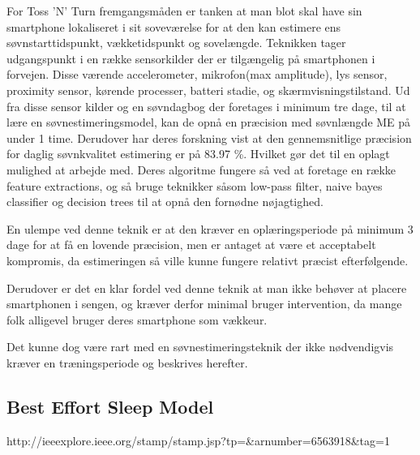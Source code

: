 For Toss 'N' Turn fremgangsmåden er tanken at man blot skal have sin smartphone lokaliseret i sit soveværelse for at den kan estimere ens søvnstarttidspunkt, vækketidspunkt og sovelængde.
Teknikken tager udgangspunkt i en række sensorkilder der er tilgængelig på smartphonen i forvejen.
Disse værende accelerometer, mikrofon(max amplitude), lys sensor, proximity sensor, kørende processer, batteri stadie, og skærmvisningstilstand.
Ud fra disse sensor kilder og en søvndagbog der foretages i minimum tre dage, til at lære en søvnestimeringsmodel, kan de opnå en præcision med søvnlængde ME på under 1 time.
Derudover har deres forskning vist at den gennemsnitlige præcision for daglig søvnkvalitet estimering er på 83.97 \%. Hvilket gør det til en oplagt mulighed at arbejde med.
Deres algoritme fungere så ved at foretage en række feature extractions, og så bruge teknikker såsom low-pass filter, naive bayes classifier og decision trees til at opnå den fornødne nøjagtighed.

En ulempe ved denne teknik er at den kræver en oplæringsperiode på minimum 3 dage for at få en lovende præcision, men er antaget at være et acceptabelt kompromis, da estimeringen så ville kunne fungere relativt præcist efterfølgende.

Derudover er det en klar fordel ved denne teknik at man ikke behøver at placere smartphonen i sengen, og kræver derfor minimal bruger intervention, da mange folk alligevel bruger deres smartphone som vækkeur.

Det kunne dog være rart med en søvnestimeringsteknik der ikke nødvendigvis kræver en træningsperiode og beskrives herefter.

\subsection{Best Effort Sleep Model}
http://ieeexplore.ieee.org/stamp/stamp.jsp?tp=&arnumber=6563918&tag=1
 
